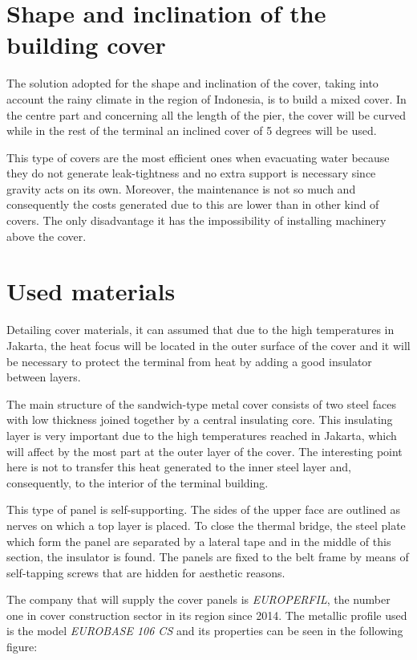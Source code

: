 	\section{Shape and inclination of the building cover}
	
The solution adopted for the shape and inclination of the cover, taking into account the rainy climate in the region of Indonesia, is to build a mixed cover. In the centre part and concerning all the length of the pier, the cover will be curved while in the rest of the terminal an inclined cover of 5 degrees will be used.

This type of covers are the most efficient ones when evacuating water because they do not generate leak-tightness and no extra support is necessary since gravity acts on its own. Moreover, the maintenance is not so much and consequently the costs generated due to this are lower than in other kind of covers. The only disadvantage it has the impossibility of installing machinery above the cover.

	\section{Used materials}
	
Detailing cover materials, it can assumed that due to the high temperatures in Jakarta, the heat focus will be located in the outer surface of the cover and it will be necessary to protect the terminal from heat by adding a good insulator between layers.

The main structure of the sandwich-type metal cover consists of two steel faces with low thickness joined together by a central insulating core. This insulating layer is very important due to the high temperatures reached in Jakarta, which will affect by the most part at the outer layer of the cover. The interesting point here is not to transfer this heat generated to the inner steel layer and, consequently, to the interior of the terminal building.

This type of panel is self-supporting. The sides of the upper face are outlined as nerves on which a top layer is placed. To close the thermal bridge, the steel plate which form the panel are separated by a lateral tape and in the middle of this section, the insulator is found. The panels are fixed to the belt frame by means of self-tapping screws that are hidden for aesthetic reasons.

The company that will supply the cover panels is \textit{EUROPERFIL}, the number one in cover construction sector in its region since 2014. The metallic profile used is the model \textit{EUROBASE 106 CS} and its properties can be seen in the following figure:

